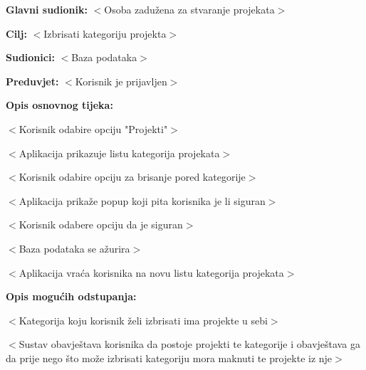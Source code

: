 					\begin{packed_item}

						\item \textbf{Glavni sudionik: }$<$Osoba zadužena za stvaranje projekata$>$
						\item  \textbf{Cilj:} $<$Izbrisati kategoriju projekta$>$
						\item  \textbf{Sudionici:} $<$Baza podataka$>$
						\item  \textbf{Preduvjet:} $<$Korisnik je prijavljen$>$
						\item  \textbf{Opis osnovnog tijeka:}

						\item[] \begin{packed_enum}

							\item $<$Korisnik odabire opciju "Projekti"$>$
							\item $<$Aplikacija prikazuje listu kategorija projekata$>$
							\item $<$Korisnik odabire opciju za brisanje pored kategorije$>$
							\item $<$Aplikacija prikaže popup koji pita korisnika je li siguran$>$
							\item $<$Korisnik odabere opciju da je siguran$>$
							\item $<$Baza podataka se ažurira$>$
							\item $<$Aplikacija vraća korisnika na novu listu kategorija projekata$>$
						\end{packed_enum}

						\item  \textbf{Opis mogućih odstupanja:}

						\item[] \begin{packed_item}

							\item[5.a] $<$Kategorija koju korisnik želi izbrisati ima projekte u sebi$>$
							\item[] \begin{packed_enum}

								\item $<$Sustav obavještava korisnika da postoje projekti te kategorije i obavještava ga
								da prije nego što može izbrisati kategoriju mora maknuti te projekte iz nje$>$

							\end{packed_enum}

						\end{packed_item}
					\end{packed_item}

